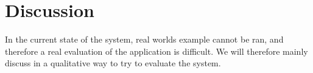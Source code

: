 \chapter{Discussion}
\label{chap:discussion}
In the current state of the system, real worlds example cannot be ran, 
and therefore a real evaluation of the application is difficult. 
We will therefore mainly discuss in a qualitative way to try to evaluate the system.
%

%

%